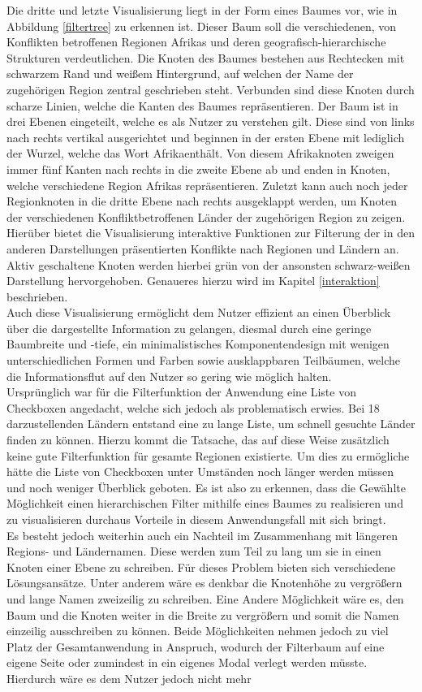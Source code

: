 \documentclass[usegeometry=true]{scrartcl}
\begin{document}
Die dritte und letzte Visualisierung liegt in der Form eines Baumes vor, wie in Abbildung \ref{filtertree} zu erkennen ist. Dieser Baum soll die verschiedenen, von Konflikten betroffenen Regionen Afrikas und deren geografisch-hierarchische Strukturen verdeutlichen. Die Knoten des Baumes bestehen aus Rechtecken mit schwarzem Rand und weißem Hintergrund, auf welchen der Name der zugehörigen Region zentral geschrieben steht. Verbunden sind diese Knoten durch scharze Linien, welche die Kanten des Baumes repräsentieren. Der Baum ist in drei Ebenen eingeteilt, welche es als Nutzer zu verstehen gilt. Diese sind von links nach rechts vertikal ausgerichtet und beginnen in der ersten Ebene mit lediglich der Wurzel, welche das Wort \glqq Afrika\grqq enthält. Von diesem Afrikaknoten zweigen immer fünf Kanten nach rechts in die zweite Ebene ab und enden in Knoten, welche verschiedene Region Afrikas repräsentieren. Zuletzt kann auch noch jeder Regionknoten in die dritte Ebene nach rechts ausgeklappt werden, um Knoten der verschiedenen Konfliktbetroffenen Länder der zugehörigen Region zu zeigen. Hierüber bietet die Visualisierung interaktive Funktionen zur Filterung der in den anderen Darstellungen präsentierten Konflikte nach Regionen und Ländern an. Aktiv geschaltene Knoten werden hierbei grün von der ansonsten schwarz-weißen Darstellung hervorgehoben. Genaueres hierzu wird im Kapitel \ref{interaktion} beschrieben.\\ Auch diese Visualisierung ermöglicht dem Nutzer effizient an einen Überblick über die dargestellte Information zu gelangen, diesmal durch eine geringe Baumbreite und -tiefe, ein minimalistisches Komponentendesign mit wenigen unterschiedlichen Formen und Farben sowie ausklappbaren Teilbäumen, welche die Informationsflut auf den Nutzer so gering wie möglich halten.\\ Ursprünglich war für die Filterfunktion der Anwendung eine Liste von Checkboxen angedacht, welche sich jedoch als problematisch erwies. Bei 18 darzustellenden Ländern entstand eine zu lange Liste, um schnell gesuchte Länder finden zu können. Hierzu kommt die Tatsache, das auf diese Weise zusätzlich keine gute Filterfunktion für gesamte Regionen existierte. Um dies zu ermögliche hätte die Liste von Checkboxen unter Umständen noch länger werden müssen und noch weniger Überblick geboten. Es ist also zu erkennen, dass die Gewählte Möglichkeit einen hierarchischen Filter mithilfe eines Baumes zu realisieren und zu visualisieren durchaus Vorteile in diesem Anwendungsfall mit sich bringt.\\ Es besteht jedoch weiterhin auch ein Nachteil im Zusammenhang mit längeren Regions- und Ländernamen. Diese werden zum Teil zu lang um sie in einen Knoten einer Ebene zu schreiben. Für dieses Problem bieten sich verschiedene Lösungsansätze. Unter anderem wäre es denkbar die Knotenhöhe zu vergrößern und lange Namen zweizeilig zu schreiben. Eine Andere Möglichkeit wäre es, den Baum und die Knoten weiter in die Breite zu vergrößern und somit die Namen einzeilig ausschreiben zu können. Beide Möglichkeiten nehmen jedoch zu viel Platz der Gesamtanwendung in Anspruch, wodurch der Filterbaum auf eine eigene Seite oder zumindest in ein eigenes Modal verlegt werden müsste. Hierdurch wäre es dem Nutzer jedoch nicht mehr 
\end{document}
